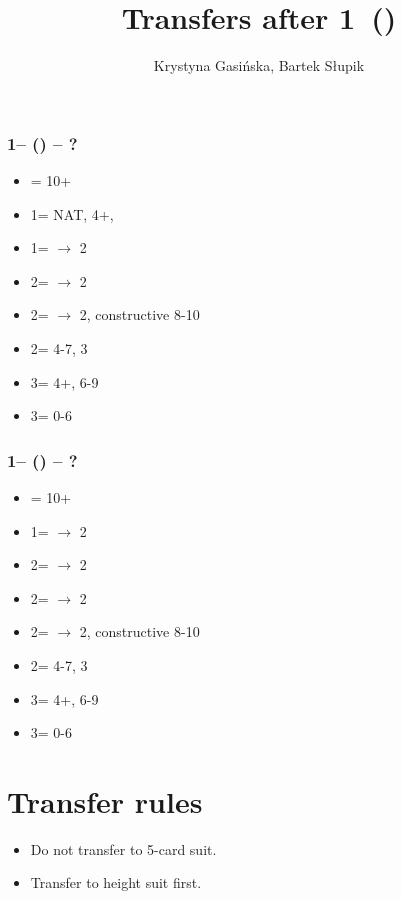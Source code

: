 \documentclass[12pt, a4paper]{article}
\title{Transfers after 1\majs\ (\dbl)}
\author{Krystyna Gasińska, Bartek Słupik}
\begin{document}
\maketitle


\subsubsection*{1\hearts -- (\dbl) -- ?}
\begin{itemize}
    \item \rdbl = 10+
    \item 1\spades = NAT, 4+\spades, \fonce
    \item 1\nt = $\rightarrow$ 2\clubs
    \item 2\clubs = $\rightarrow$ 2\diams
    \item 2\diams = $\rightarrow$ 2\hearts, constructive 8-10
    \item 2\hearts = 4-7, 3\hearts
    \item 3\diams = 4+\hearts, 6-9
    \item 3\hearts = 0-6 \hcp
\end{itemize}

\subsubsection*{1\spades -- (\dbl) -- ?}
\begin{itemize}
    \item \rdbl = 10+
    \item 1\nt = $\rightarrow$ 2\clubs
    \item 2\clubs = $\rightarrow$ 2\diams
    \item 2\diams = $\rightarrow$ 2\hearts
    \item 2\hearts = $\rightarrow$ 2\spades, constructive 8-10
    \item 2\spades = 4-7, 3\spades
    \item 3\hearts = 4+\spades, 6-9
    \item 3\spades = 0-6 \hcp
\end{itemize}


\section{Transfer rules}
\begin{itemize}
    \item Do not transfer to 5-card suit.
    \item Transfer to height suit first.
\end{itemize}
\end{document}
